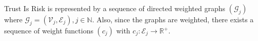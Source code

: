{}
\begin{definition}[Graph]
  Trust Is Risk is represented by a sequence of directed weighted graphs $\left(\mathcal{G}_j\right)$ where $\mathcal{G}_j
  = \left(\mathcal{V}_j, \mathcal{E}_j\right), j \in \mathbb{N}$.
  Also, since the graphs are weighted, there exists a sequence of weight functions $\left(c_j\right)$ with $c_j :
  \mathcal{E}_j \rightarrow \mathbb{R}^{+}$.
\end{definition}
